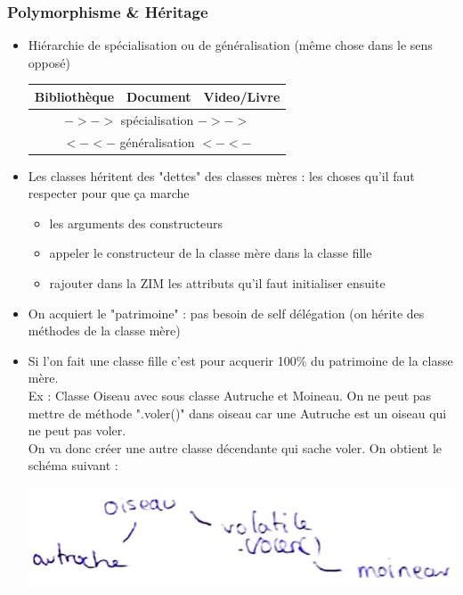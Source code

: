 \documentclass[12pt,a4paper]{article}
\begin{document}
\subsubsection{Polymorphisme \& Héritage}
\begin{itemize}
\item Hiérarchie de spécialisation ou de généralisation (même chose dans le sens opposé)
\begin{tabular}{|c|c|c|}
  \hline
  Bibliothèque & Document & Video/Livre \\ \hline
  \multicolumn{3}{|c|}{$-> ->$ spécialisation $-> ->$}\\\hline
  \multicolumn{3}{|c|}{$<- <-$ généralisation $<- <-$}\\\hline
\end{tabular}
\item Les classes héritent des "dettes" des classes mères : les choses qu'il faut respecter pour que ça marche
\begin{itemize}
\item les arguments des constructeurs
\item appeler le constructeur de la classe mère dans la classe fille
\item rajouter dans la ZIM les attributs qu'il faut initialiser ensuite
\end{itemize}
\item On acquiert le "patrimoine" : pas besoin de self délégation (on hérite des méthodes de la classe mère)
\item Si l'on fait une classe fille c'est pour acquerir 100\% du patrimoine de la classe mère.\\
Ex : Classe Oiseau avec sous classe Autruche et Moineau. On ne peut pas mettre de méthode ".voler()" dans oiseau car une Autruche est un oiseau qui ne peut pas voler.\\
On va donc créer une autre classe décendante qui sache voler. On obtient le schéma suivant :
\begin{center}
\includegraphics[scale=0.5]{sous-classe-oiseau}
\end{center}
\end{itemize}
\end{document}
